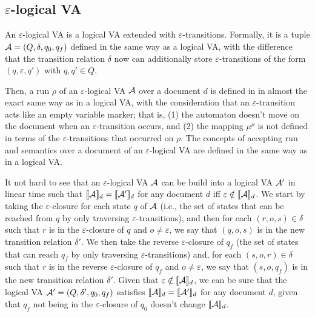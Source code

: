 \subsection{$\varepsilon$-logical VA}

An $\varepsilon$-logical VA is a logical VA extended with
$\varepsilon$-transitions. Formally, it is a tuple $\mathcal{A} = (Q, \delta, q_0, q_f)$
defined in the same way as a logical VA, with the difference that the transition
relation $\delta$ now can additionally store $\varepsilon$-transitions of the
form $(q, \varepsilon, q')$ with $q, q' \in Q$.

Then, a run $\rho$ of an $\varepsilon$-logical VA $\mathcal{A}$ over a document $d$ is
defined in in almost the exact same way as in a logical VA, with the
consideration that an $\varepsilon$-transition acts like an empty variable
marker; that is, (1) the automaton doesn't move on the document when an
$\varepsilon$-transition occurs, and (2) the mapping $\mu^\rho$ is not defined
in terms of the $\varepsilon$-transitions that occurred on $\rho$. The concepts
of accepting run and semantics over a document of an $\varepsilon$-logical VA
are defined in the same way as in a logical VA.



It not hard to see that an $\varepsilon$-logical VA $\mathcal{A}$ can be build into a
logical VA $\mathcal{A}'$ in linear time such that $\llbracket\mathcal{A}\rrbracket_{d} = \llbracket\mathcal{A}'\rrbracket_{d}$ for any
document $d$ iff $\varepsilon \notin \llbracket\mathcal{A}\rrbracket_{d}$. We start by taking the
$\varepsilon$-closure for each state $q$ of $\mathcal{A}$ (i.e., the set of states that
can be reached from $q$ by only traversing $\varepsilon$-transitions), and then
for each $(r, o, s) \in \delta$ such that $r$ is in the $\varepsilon$-closure of
$q$ and $o \neq \varepsilon$, we say that $(q, o, s)$ is in the new transition
relation $\delta'$. We then take the reverse $\varepsilon$-closure of $q_f$ (the
set of states that can reach $q_f$ by only traversing $\varepsilon$-transitions)
and, for each $(s, o, r) \in \delta$ such that $r$ is in the reverse
$\varepsilon$-closure of $q_f$ and $o \neq \varepsilon$, we say that $(s, o,
q_f)$ is in the new transition relation $\delta'$. Given that $\varepsilon
\notin \llbracket\mathcal{A}\rrbracket_{d}$, we can be sure that the logical VA $\mathcal{A}' = (Q, \delta', q_0,
q_f)$ satisfies $\llbracket\mathcal{A}\rrbracket_{d} = \llbracket\mathcal{A}'\rrbracket_{d}$ for any document $d$, given that
$q_f$ not being in the $\varepsilon$-closure of $q_0$ doesn't change
$\llbracket\mathcal{A}\rrbracket_{d}$.


